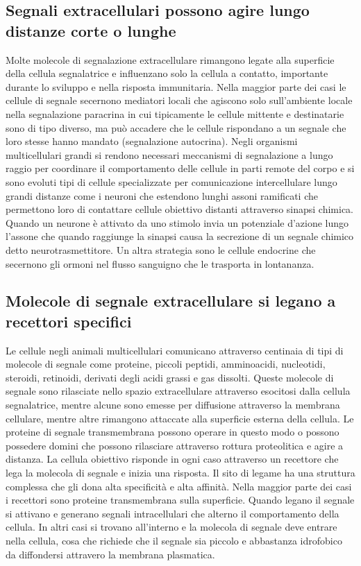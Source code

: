 \subsection{Segnali extracellulari possono agire lungo distanze corte o lunghe}
Molte molecole di segnalazione extracellulare rimangono legate alla superficie della cellula segnalatrice e influenzano solo la cellula a contatto, importante durante lo sviluppo e 
nella risposta immunitaria. Nella maggior parte dei casi le cellule di segnale secernono mediatori locali che agiscono solo sull'ambiente locale nella segnalazione paracrina in cui
tipicamente le cellule mittente e destinatarie sono di tipo diverso, ma pu\`o accadere che le cellule rispondano a un segnale che loro stesse hanno mandato (segnalazione autocrina).
Negli organismi multicellulari grandi si rendono necessari meccanismi di segnalazione a lungo raggio per coordinare il comportamento delle cellule in parti remote del corpo e si sono
evoluti tipi di cellule specializzate per comunicazione intercellulare lungo grandi distanze come i neuroni che estendono lunghi assoni ramificati che permettono loro di contattare
cellule obiettivo distanti attraverso sinapsi chimica. Quando un neurone \`e attivato da uno stimolo invia un potenziale d'azione lungo l'assone che quando raggiunge la sinapsi 
causa la secrezione di un segnale chimico detto neurotrasmettitore. Un altra strategia sono le cellule endocrine che secernono gli ormoni nel flusso sanguigno che le trasporta in
lontananza. 
\subsection{Molecole di segnale extracellulare si legano a recettori specifici}
Le cellule negli animali multicellulari comunicano attraverso centinaia di tipi di molecole di segnale come proteine, piccoli peptidi, amminoacidi, nucleotidi, steroidi, retinoidi, 
derivati degli acidi grassi e gas dissolti. Queste molecole di segnale sono rilasciate nello spazio extracellulare attraverso esocitosi dalla cellula segnalatrice, mentre alcune sono
emesse per diffusione attraverso la membrana cellulare, mentre altre rimangono attaccate alla superficie esterna della cellula. Le proteine di segnale transmembrana possono operare in
questo modo o possono possedere domini che possono rilasciare attraverso rottura proteolitica e agire a distanza. La cellula obiettivo risponde in ogni caso attraverso un recettore che 
lega la molecola di segnale e inizia una risposta. Il sito di legame ha una struttura complessa che gli dona alta specificit\`a e alta affinit\`a. Nella maggior parte dei casi i 
recettori sono proteine transmembrana sulla superficie. Quando legano il segnale si attivano e generano segnali intracellulari che alterno il comportamento della cellula. In 
altri casi si trovano all'interno e la molecola di segnale deve entrare nella cellula, cosa che richiede che il segnale sia piccolo e abbastanza idrofobico da diffondersi attravero 
la membrana plasmatica. 
